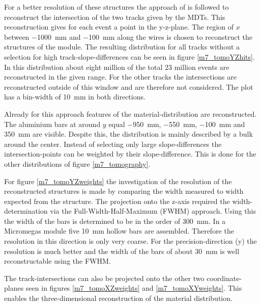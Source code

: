 \documentclass[
twoside,            %
BCOR1.4cm,          %
10pt,               %
headings=normal,    %
headsepline,        %
clearplainpage,		%
final,              %
div=14,
open=right,
bibliography=toc
]{scrreprt}
\begin{document}
For a better resolution of these structures the approach of \cite{loeselThesis} is followed to reconstruct the intersection of the two tracks given by the MDTs.
This reconstruction gives for each event a point in the y-z-plane.
The region of $x$ between \SI{-1000}{mm} and \SI{-100}{mm} along the wires is chosen to reconstruct the structures of the module.
The resulting distribution for all tracks without a selection for high track-slope-differences can be seen in figure \ref{m7_tomoYZhits}.
In this distribution about eight million of the total 23 million events are reconstructed in the given range.
For the other tracks the intersections are reconstructed outside of this window and are therefore not considered.
The plot has a bin-width of \SI{10}{mm} in both directions.

Already for this approach features of the material-distribution are reconstructed.
The aluminium bars at around $y$ equal \SI{-950}{mm}, \SI{-550}{mm}, \SI{-100}{mm} and \SI{350}{mm} are visible.
Despite this, the distribution is mainly described by a bulk around the center.
Instead of selecting only large slope-differences the intersection-points can be weighted by their slope-difference.
This is done for the other distributions of figure \ref{m7_tomography}.

For figure \ref{m7_tomoYZweights} the investigation of the resolution of the reconstructed structures is made by comparing the width measured to width expected from the structure.
The projection onto the z-axis required the width-determination via the Full-Width-Half-Maximum (FWHM) approach.
Using this the width of the bars is determined to be in the order of \SI{300}{mm}.
In a Micromegas module five \SI{10}{mm} hollow bars are assembled.
Therefore the resolution in this direction is only very coarse.
For the precision-direction (y) the resolution is much better and the width of the bars of about \SI{30}{mm} is well reconstructable using the FWHM.

The track-intersections can also be projected onto the other two coordinate-planes seen in figures \ref{m7_tomoXZweights} and \ref{m7_tomoXYweights}.
This enables the three-dimensional reconstruction of the material distribution.
\end{document}
